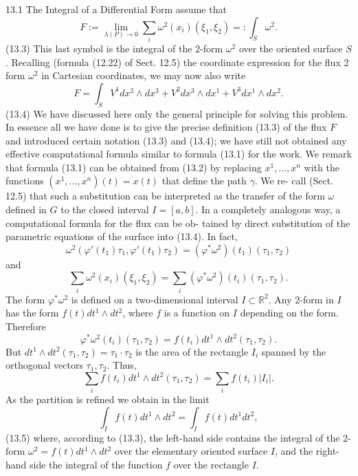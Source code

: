 13.1 The Integral of a Differential Form
assume that
$$ F := \lim_{\lambda(P)\to 0} \sum_i \omega^2(x_i)(\xi_1, \xi_2) =: \int_S \omega^2. $$
(13.3)
This last symbol is the integral of the 2-form $\omega^2$ over the oriented surface $S$.
Recalling (formula (12.22) of Sect. 12.5) the coordinate expression for the flux
2
form $\omega^2$ in Cartesian coordinates, we may now also write
$$ F = \int_S V^1 dx^2 \wedge dx^3 + V^2 dx^3 \wedge dx^1 + V^3 dx^1 \wedge dx^2. $$
(13.4)
We have discussed here only the general principle for solving this problem. In
essence all we have done is to give the precise definition (13.3) of the flux $F$ and
introduced certain notation (13.3) and (13.4); we have still not obtained any effective
computational formula similar to formula (13.1) for the work.
We remark that formula (13.1) can be obtained from (13.2) by replacing
$x^1, \ldots, x^n$ with the functions $(x^1, \ldots, x^n)(t) = x(t)$ that define the path $\gamma$. We re-
call (Sect. 12.5) that such a substitution can be interpreted as the transfer of the form
$\omega$ defined in $G$ to the closed interval $I = [a, b]$.
In a completely analogous way, a computational formula for the flux can be ob-
tained by direct substitution of the parametric equations of the surface into (13.4).
In fact,
$$ \omega^2(\varphi'(t_1) \tau_1, \varphi'(t_1) \tau_2) = (\varphi^*\omega^2)(t_1)(\tau_1, \tau_2) $$
and
$$ \sum_i \omega^2(x_i)(\xi_1, \xi_2) = \sum_i (\varphi^*\omega^2)(t_i)(\tau_1, \tau_2). $$
The form $\varphi^*\omega^2$ is defined on a two-dimensional interval $I \subset \mathbb{R}^2$. Any 2-form
in $I$ has the form $f(t) dt^1 \wedge dt^2$, where $f$ is a function on $I$ depending on the form.
Therefore
$$ \varphi^*\omega^2(t_i)(\tau_1, \tau_2) = f(t_i) dt^1 \wedge dt^2(\tau_1, \tau_2). $$
But $dt^1 \wedge dt^2(\tau_1, \tau_2) = \tau_1 \cdot \tau_2$ is the area of the rectangle $I_i$ spanned by the
orthogonal vectors $\tau_1, \tau_2$.
Thus,
$$ \sum_i f(t_i) dt^1 \wedge dt^2(\tau_1, \tau_2) = \sum_i f(t_i) |I_i|. $$
As the partition is refined we obtain in the limit
$$ \int_I f(t) dt^1 \wedge dt^2 = \int_I f(t) dt^1 dt^2, $$
(13.5)
where, according to (13.3), the left-hand side contains the integral of the 2-form
$\omega^2 = f(t) dt^1 \wedge dt^2$ over the elementary oriented surface $I$, and the right-hand side
the integral of the function $f$ over the rectangle $I$.